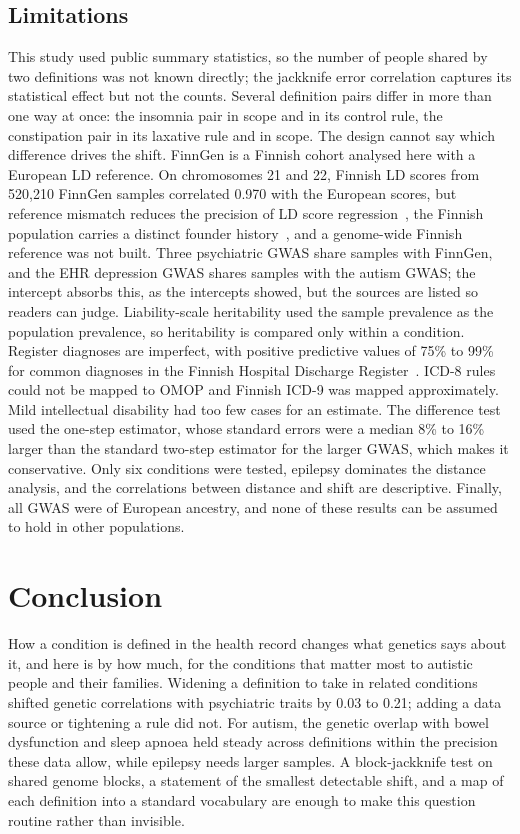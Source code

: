 \documentclass[conference]{IEEEtran}
\begin{document}
\subsection{Limitations}
This study used public summary statistics, so the number of people shared by two definitions was not known directly; the jackknife error correlation captures its statistical effect but not the counts. Several definition pairs differ in more than one way at once: the insomnia pair in scope and in its control rule, the constipation pair in its laxative rule and in scope. The design cannot say which difference drives the shift. FinnGen is a Finnish cohort analysed here with a European LD reference. On chromosomes 21 and 22, Finnish LD scores from 520,210 FinnGen samples correlated 0.970 with the European scores, but reference mismatch reduces the precision of LD score regression~\cite{ni2018}, the Finnish population carries a distinct founder history~\cite{lim2014}, and a genome-wide Finnish reference was not built. Three psychiatric GWAS share samples with FinnGen, and the EHR depression GWAS shares samples with the autism GWAS; the intercept absorbs this, as the intercepts showed, but the sources are listed so readers can judge. Liability-scale heritability used the sample prevalence as the population prevalence, so heritability is compared only within a condition. Register diagnoses are imperfect, with positive predictive values of 75\% to 99\% for common diagnoses in the Finnish Hospital Discharge Register~\cite{sund2012}. ICD-8 rules could not be mapped to OMOP and Finnish ICD-9 was mapped approximately. Mild intellectual disability had too few cases for an estimate. The difference test used the one-step estimator, whose standard errors were a median 8\% to 16\% larger than the standard two-step estimator for the larger GWAS, which makes it conservative. Only six conditions were tested, epilepsy dominates the distance analysis, and the correlations between distance and shift are descriptive. Finally, all GWAS were of European ancestry, and none of these results can be assumed to hold in other populations.

\section{Conclusion}
How a condition is defined in the health record changes what genetics says about it, and here is by how much, for the conditions that matter most to autistic people and their families. Widening a definition to take in related conditions shifted genetic correlations with psychiatric traits by 0.03 to 0.21; adding a data source or tightening a rule did not. For autism, the genetic overlap with bowel dysfunction and sleep apnoea held steady across definitions within the precision these data allow, while epilepsy needs larger samples. A block-jackknife test on shared genome blocks, a statement of the smallest detectable shift, and a map of each definition into a standard vocabulary are enough to make this question routine rather than invisible.
\end{document}
